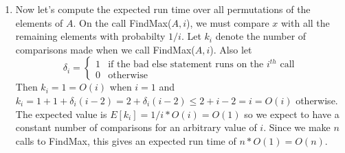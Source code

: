 \documentclass[11pt]{article}
\begin{document}
\begin{enumerate}
\item Now let's compute the expected run time over all permutations of the elements of $A$.
On the call FindMax($A, i$), we must compare $x$ with all the remaining elements with probabilty $1/i$.
Let $k_i$ denote the number of comparisons made when we call FindMax($A, i$).
Also let
\[ \delta _i =
\begin{cases}
    1 & \text{if the bad else statement runs on the $i^{th}$ call} \\
    0 & \text{otherwise}
\end{cases}
\]
Then $k_i = 1 = O(i)$ when $i = 1$ and $k_i = 1 + 1 + \delta_i (i - 2) = 2 + \delta _i (i-2) \leq 2 + i - 2 = i = O(i)$ otherwise.
The expected value is $E[k_i] = 1/i * O(i) = O(1)$ so we expect to have a constant number of comparisons for an arbitrary value of $i$.
Since we make $n$ calls to FindMax, this gives an expected run time of $n * O(1) = O(n)$.

\end{enumerate}
\end{document}
